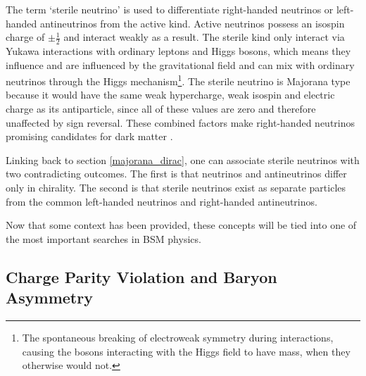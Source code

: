 \documentclass[10pt]{article}
\begin{document}
The term `sterile neutrino' is used to differentiate right-handed neutrinos or left-handed antineutrinos from the active kind. Active neutrinos possess an isospin charge of $\pm\frac{1}{2}$ and interact weakly as a result. The sterile kind only interact via Yukawa interactions with ordinary leptons and Higgs bosons, which means they influence and are influenced by the gravitational field and can mix with ordinary neutrinos through the Higgs mechanism\footnote{The spontaneous breaking of electroweak symmetry during interactions, causing the bosons interacting with the Higgs field to have mass, when they otherwise would not.}. The sterile neutrino is Majorana type because it would have the same weak hypercharge, weak isospin and electric charge as its antiparticle, since all of these values are zero and therefore unaffected by sign reversal. These combined factors make right-handed neutrinos promising candidates for dark matter \cite{boyarsky2019sterile}.

Linking back to section \ref{majorana_dirac}, one can associate sterile neutrinos with two contradicting outcomes. The first is that neutrinos and antineutrinos differ only in chirality. The second is that sterile neutrinos exist as separate particles from the common left-handed neutrinos and right-handed antineutrinos.

Now that some context has been provided, these concepts will be tied into one of the most important searches in BSM physics.

\subsection{Charge Parity Violation and Baryon Asymmetry} \label{CPV_bar}
\end{document}
